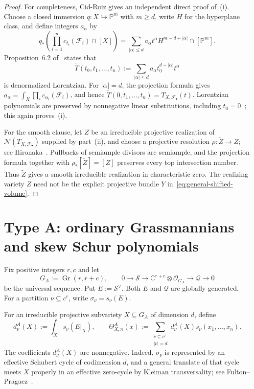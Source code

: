 \documentclass[11pt,a4paper,oneside]{amsart}
\numberwithin{equation}{section}
\theoremstyle{definition}
\theoremstyle{remark}
\DeclareMathOperator{\Gr}{Gr}
\newcommand{\C}{\mathbb C}
\newcommand{\cN}{\mathcal N}
\newcommand{\cO}{\mathcal O}
\newcommand{\cS}{\mathcal S}
\newcommand{\cQ}{\mathcal Q}
\newcommand{\cF}{\mathcal F}
\begin{document}
\begin{proof}
For completeness, Cid-Ruiz gives an independent direct proof of~\textup{(i)}.  Choose a closed immersion $q:X\hookrightarrow\mathbb P^m$ with $m\geq d$, write $H$ for the hyperplane class, and define integers $a_\alpha$ by
\[
 q_*\!\left(\prod_{i=1}^n c_{t_i}(\cF_i)\cap[X]\right)
 =\sum_{|\alpha|\leq d}a_\alpha t^\alpha
   H^{m-d+|\alpha|}\cap[\mathbb P^m].
\]
Proposition~6.2 of~\cite{CidRuiz26} states that
\[
 \widetilde T(t_0,t_1,\ldots,t_n)
 :=\sum_{|\alpha|\leq d}a_\alpha
   t_0^{d-|\alpha|}t^\alpha
\]
is denormalized Lorentzian.  For $|\alpha|=d$, the projection formula gives
$a_\alpha=\int_X\prod_i c_{\alpha_i}(\cF_i)$, and hence
$\widetilde T(0,t_1,\ldots,t_n)=T_{X,\cF_\bullet}(t)$.  Lorentzian polynomials are preserved by nonnegative linear substitutions, including $t_0=0$~\cite[Theorem~2.10]{BH20}; this again proves~\textup{(i)}.

For the smooth clause, let $Z$ be an irreducible projective realization of $\cN(T_{X,\cF_\bullet})$ supplied by part~\textup{(ii)}, and choose a projective resolution $\rho:\widetilde Z\to Z$; see Hironaka~\cite{Hironaka64}.  Pullbacks of semiample divisors are semiample, and the projection formula together with $\rho_*[\widetilde Z]=[Z]$ preserves every top intersection number.  Thus $\widetilde Z$ gives a smooth irreducible realization in characteristic zero.  The realizing variety $Z$ need not be the explicit projective bundle $Y$ in~\eqref{eq:general-shifted-volume}.
\end{proof}

\section{Type A: ordinary Grassmannians and skew Schur polynomials}\label{sec:typeA}

Fix positive integers $r,c$ and let
\[
 G_A:=\Gr(r,r+c),
 \qquad
 0\longrightarrow\cS\longrightarrow\C^{r+c}\otimes\cO_{G_A}
 \longrightarrow\cQ\longrightarrow0
\]
be the universal sequence.  Put $E:=\cS^\vee$.  Both $E$ and $\cQ$ are globally generated.  For a partition $\nu\subseteq c^r$, write $\sigma_\nu=s_\nu(E)$.

For an irreducible projective subvariety $X\subseteq G_A$ of dimension $d$, define
\begin{equation}\label{eq:typeA-transform}
 d_\nu^A(X):=\int_Xs_\nu(E|_X),
 \qquad
 \Theta^A_{X,n}(x):=
 \sum_{\substack{\nu\subseteq c^r\\|\nu|=d}}
 d_\nu^A(X)s_\nu(x_1,\ldots,x_n).
\end{equation}
The coefficients $d_\nu^A(X)$ are nonnegative.  Indeed, $\sigma_\nu$ is represented by an effective Schubert cycle of codimension $d$, and a general translate of that cycle meets $X$ properly in an effective zero-cycle by Kleiman transversality; see Fulton--Pragacz~\cite[Chapter~4]{FultonPragacz}.
\end{document}
